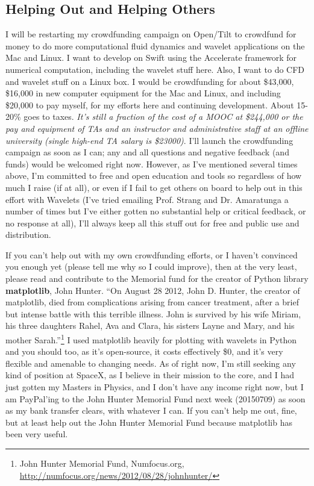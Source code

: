 \documentclass[twoside]{amsart}
\theoremstyle{plain}
\theoremstyle{definition}
\theoremstyle{remark}
\numberwithin{equation}{section}
\begin{document}
\subsection{Helping Out and Helping Others}

I will be restarting my crowdfunding campaign on Open/Tilt to crowdfund for money to do more computational fluid dynamics and wavelet applications on the Mac and Linux.  I want to develop on Swift using the Accelerate framework for numerical computation, including the wavelet stuff here.  Also, I want to do CFD and wavelet stuff on a Linux box.  I would be crowdfunding for about \$43,000, \$16,000 in new computer equipment for the Mac and Linux, and including \$20,000 to pay myself, for my efforts here and continuing development.  About 15-20\% goes to taxes.  \emph{It's still a fraction of the cost of a MOOC at \$244,000 or the pay and equipment of TAs and an instructor and administrative staff at an offline university (single high-end TA salary is \$23000)}.  I'll launch the crowdfunding campaign as soon as I can; any and all questions and negative feedback (and funds) would be welcomed right now.  However, as I've mentioned several times above, I'm committed to free and open education and tools so regardless of how much I raise (if at all), or even if I fail to get others on board to help out in this effort with Wavelets (I've tried emailing Prof. Strang and Dr. Amaratunga a number of times but I've either gotten no substantial help or critical feedback, or no response at all), I'll always keep all this stuff out for free and public use and distribution.  

If you can't help out with my own crowdfunding efforts, or I haven't convinced you enough yet (please tell me why so I could improve), then at the very least, please read and contribute to the Memorial fund for the creator of Python library \textbf{matplotlib}, John Hunter.  ``On August 28 2012, John D. Hunter, the creator of matplotlib, died from complications arising from cancer treatment, after a brief but intense battle with this terrible illness. John is survived by his wife Miriam, his three daughters Rahel, Ava and Clara, his sisters Layne and Mary, and his mother Sarah.''\footnote{John Hunter Memorial Fund, Numfocus.org, \url{http://numfocus.org/news/2012/08/28/johnhunter/}}  I used matplotlib heavily for plotting with wavelets in Python and you should too, as it's open-source, it costs effectively \$0, and it's very flexible and amenable to changing needs.  As of right now, I'm still seeking any kind of position at SpaceX, as I believe in their mission to the core, and I had just gotten my Masters in Physics, and I don't have any income right now, but I am PayPal'ing to the John Hunter Memorial Fund next week (20150709) as soon as my bank transfer clears, with whatever I can.  If you can't help me out, fine, but at least help out the John Hunter Memorial Fund because matplotlib has been very useful.   
\end{document}
